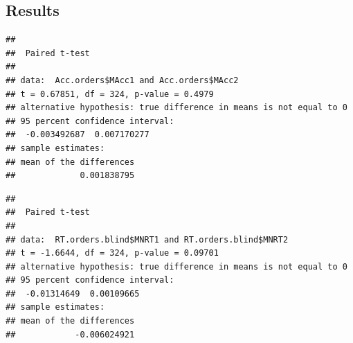 \documentclass[english,man]{apa7}
\begin{document}
\hypertarget{results-1}{%
\subsection{Results}\label{results-1}}

\begin{verbatim}
## 
##  Paired t-test
## 
## data:  Acc.orders$MAcc1 and Acc.orders$MAcc2
## t = 0.67851, df = 324, p-value = 0.4979
## alternative hypothesis: true difference in means is not equal to 0
## 95 percent confidence interval:
##  -0.003492687  0.007170277
## sample estimates:
## mean of the differences 
##             0.001838795
\end{verbatim}

\begin{verbatim}
## 
##  Paired t-test
## 
## data:  RT.orders.blind$MNRT1 and RT.orders.blind$MNRT2
## t = -1.6644, df = 324, p-value = 0.09701
## alternative hypothesis: true difference in means is not equal to 0
## 95 percent confidence interval:
##  -0.01314649  0.00109665
## sample estimates:
## mean of the differences 
##            -0.006024921
\end{verbatim}
\end{document}
